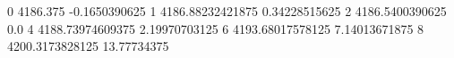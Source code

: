 0 4186.375 -0.1650390625
1 4186.88232421875 0.34228515625
2 4186.5400390625 0.0
4 4188.73974609375 2.19970703125
6 4193.68017578125 7.14013671875
8 4200.3173828125 13.77734375
